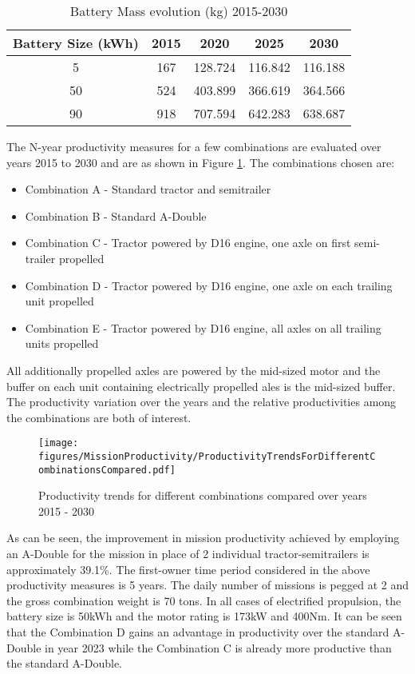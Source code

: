 \documentclass[ExampleMasters.tex]{subfiles}
\begin{document}
	\begin{table}[ht]
		\centering 
		\begin{tabular}{c c c c c}
			\hline
			Battery Size (kWh) & 2015 & 2020 & 2025 & 2030\\ 
			\hline
			5 & 167 & 128.724 & 116.842 & 116.188\\
			50 & 524 & 403.899 & 366.619 & 364.566\\
			90 & 918 & 707.594 & 642.283 & 638.687\\
			\hline 
		\end{tabular}
		\caption{Battery Mass evolution (kg) 2015-2030 \cite{ElementEnergy}} 
		\label{table:ParameterSensitivityBatteryMass} 
	\end{table}

	The N-year productivity measures for a few combinations are evaluated over years 2015 to 2030 and are as shown in Figure \ref{ProductivityComb20152030}. The combinations chosen are:

	\begin{itemize}
	\item Combination A - Standard tractor and semitrailer
	\item Combination B - Standard A-Double
	\item Combination C - Tractor powered by D16 engine, one axle on first semi-trailer propelled
	\item Combination D - Tractor powered by D16 engine, one axle on each trailing unit propelled
	\item Combination E - Tractor powered by D16 engine, all axles on all trailing units propelled
	\end{itemize}

	All additionally propelled axles are powered by the mid-sized motor and the buffer on each unit containing electrically propelled ales is the mid-sized buffer. The productivity variation over the years and the relative productivities among the combinations are both of interest.\\

	\begin{figure}[ht!]
		\centering
		\texttt{[image: figures/MissionProductivity/ProductivityTrendsForDifferentCombinationsCompared.pdf]}
		\caption{Productivity trends for different combinations compared over years 2015 - 2030}
		\label{ProductivityComb20152030}
	\end{figure}

	As can be seen, the improvement in mission productivity achieved by employing an A-Double for the mission in place of 2 individual tractor-semitrailers is approximately 39.1\%. The first-owner time period considered in the above productivity measures is 5 years. The daily number of missions is pegged at 2 and the gross combination weight is 70 tons. In all cases of electrified propulsion, the battery size is 50kWh and the motor rating is 173kW and 400Nm. It can be seen that the Combination D gains an advantage in productivity over the standard A-Double in year 2023 while the Combination C is already more productive than the standard A-Double.\\
\end{document}
